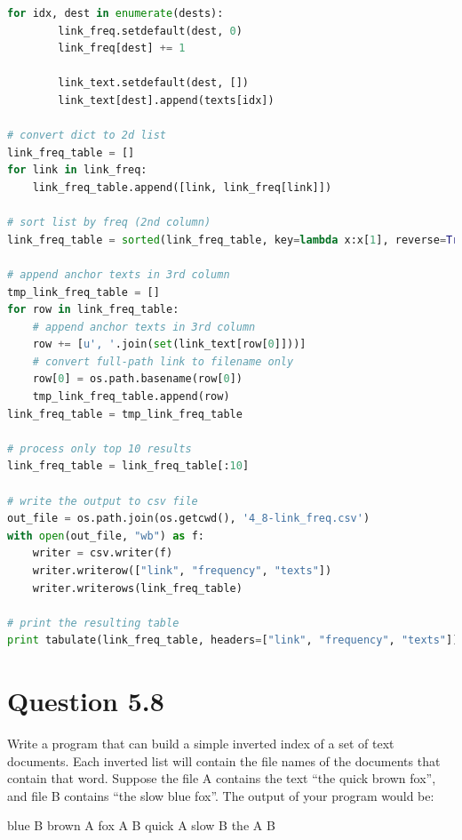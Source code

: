 \documentclass[letterpaper,11pt]{article}
\begin{document}
\begin{lstlisting}[language=python, caption={Source code for finding 10 Wikipedia documents with the most inlinks}, label={lst:inlinks}]
    for idx, dest in enumerate(dests):
        link_freq.setdefault(dest, 0)
        link_freq[dest] += 1

        link_text.setdefault(dest, [])
        link_text[dest].append(texts[idx])

# convert dict to 2d list
link_freq_table = []
for link in link_freq:
    link_freq_table.append([link, link_freq[link]])

# sort list by freq (2nd column)
link_freq_table = sorted(link_freq_table, key=lambda x:x[1], reverse=True)

# append anchor texts in 3rd column
tmp_link_freq_table = []
for row in link_freq_table:
    # append anchor texts in 3rd column
    row += [u', '.join(set(link_text[row[0]]))]
    # convert full-path link to filename only
    row[0] = os.path.basename(row[0])
    tmp_link_freq_table.append(row)
link_freq_table = tmp_link_freq_table

# process only top 10 results
link_freq_table = link_freq_table[:10]

# write the output to csv file
out_file = os.path.join(os.getcwd(), '4_8-link_freq.csv')
with open(out_file, "wb") as f:
    writer = csv.writer(f)
    writer.writerow(["link", "frequency", "texts"])
    writer.writerows(link_freq_table)

# print the resulting table
print tabulate(link_freq_table, headers=["link", "frequency", "texts"])
\end{lstlisting}

\noindent\makebox[\linewidth]{\rule{\textwidth}{0.4pt}}


\section*{Question 5.8}
\begin{spverbatim}
Write a program that can build a simple inverted index of a set of text documents. Each inverted list will contain the file names of the documents that contain that word.
Suppose the file A contains the text “the quick brown fox”, and file B contains
“the slow blue fox”. The output of your program would be:


blue B
brown A
fox A B
quick A
slow B
the A B
\end{spverbatim}
\end{document}
